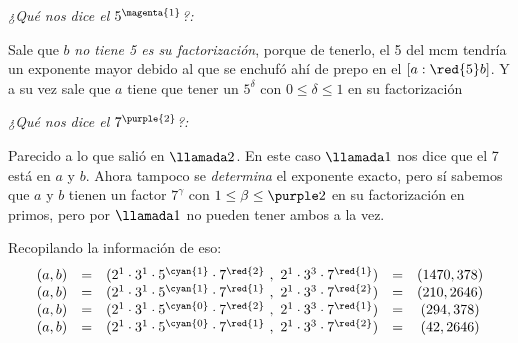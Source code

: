 \bigskip

\textit{¿Qué nos dice el $5^{\magenta{1}}$?:}\par
Sale que $b$ \textit{no tiene 5 es su factorización}, porque de tenerlo, el 5 del mcm tendría un exponente mayor debido al  que se enchufó
ahí de prepo en el $[a:\red{5}b]$. Y a su vez sale que $a$ tiene que tener un $5^\delta$ con $0 \leq \delta \leq 1$ en su factorización

\bigskip

\textit{¿Qué nos dice el $7^{\purple{2}}$?:}\par
Parecido a lo que salió en $\llamada2$. En este caso
$\llamada1$ nos dice que el 7 está en $a$ y $b$. Ahora tampoco se \textit{determina} el exponente exacto, pero sí sabemos
que $a$ y $b$ tienen un factor $7^{\gamma}$ con $1 \leq \beta \leq \purple2$ en su factorización en primos, pero por $\llamada1$ no
pueden tener ambos  a la vez.

\bigskip

Recopilando la información de eso:
$$
  \begin{array}{rcccc}
    (a,b) & = & (2^1 \cdot 3^1 \cdot 5^{\cyan{1}} \cdot 7^{\red{2}}\ ,\  2^1 \cdot 3^3 \cdot 7^{\red{1}} ) & = & (1470,378) \\
    (a,b) & = & (2^1 \cdot 3^1 \cdot 5^{\cyan{1}} \cdot 7^{\red{1}}\ ,\  2^1 \cdot 3^3 \cdot 7^{\red{2}} ) & = & (210,2646) \\
    (a,b) & = & (2^1 \cdot 3^1 \cdot 5^{\cyan{0}} \cdot 7^{\red{2}}\ ,\  2^1 \cdot 3^3 \cdot 7^{\red{1}} ) & = & (294,378)  \\
    (a,b) & = & (2^1 \cdot 3^1 \cdot 5^{\cyan{0}} \cdot 7^{\red{1}}\ ,\  2^1 \cdot 3^3 \cdot 7^{\red{2}} ) & = & (42,2646)
  \end{array}
$$


\begin{aportes}
  \item {}
\end{aportes}
